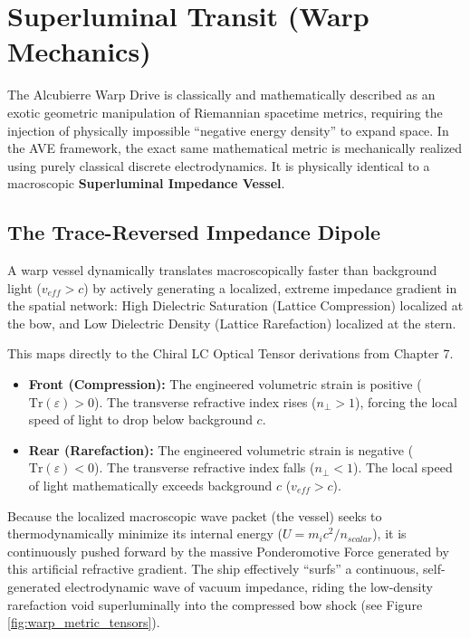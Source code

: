 \section{Superluminal Transit (Warp Mechanics)}

The Alcubierre Warp Drive is classically and mathematically described as an exotic geometric manipulation of Riemannian spacetime metrics, requiring the injection of physically impossible ``negative energy density'' to expand space. In the AVE framework, the exact same mathematical metric is mechanically realized using purely classical discrete electrodynamics. It is physically identical to a macroscopic \textbf{Superluminal Impedance Vessel}.

\subsection{The Trace-Reversed Impedance Dipole}
A warp vessel dynamically translates macroscopically faster than background light ($v_{eff} > c$) by actively generating a localized, extreme impedance gradient in the spatial network: High Dielectric Saturation (Lattice Compression) localized at the bow, and Low Dielectric Density (Lattice Rarefaction) localized at the stern.

This maps directly to the Chiral LC Optical Tensor derivations from Chapter 7. 
\begin{itemize}
    \item \textbf{Front (Compression):} The engineered volumetric strain is positive ($\text{Tr}(\varepsilon) > 0$). The transverse refractive index rises ($n_\perp > 1$), forcing the local speed of light to drop below background $c$.
    \item \textbf{Rear (Rarefaction):} The engineered volumetric strain is negative ($\text{Tr}(\varepsilon) < 0$). The transverse refractive index falls ($n_\perp < 1$). The local speed of light mathematically exceeds background $c$ ($v_{eff} > c$).
\end{itemize}

Because the localized macroscopic wave packet (the vessel) seeks to thermodynamically minimize its internal energy ($U = m_i c^2 / n_{scalar}$), it is continuously pushed forward by the massive Ponderomotive Force generated by this artificial refractive gradient. The ship effectively ``surfs'' a continuous, self-generated electrodynamic wave of vacuum impedance, riding the low-density rarefaction void superluminally into the compressed bow shock (see Figure \ref{fig:warp_metric_tensors}). 

